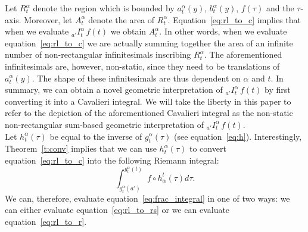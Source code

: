 \documentclass[twoside,reqno,11pt]{fcaa-var} %
\begin{document}
\noindent
Let $R_t^{\alpha}$ denote the region which is bounded by $a_t^{\alpha}(y)$, $b_t^{\alpha}(y)$, $f(\tau)$ and the $\tau$-axis. Moreover, let $A_{t}^{\alpha}$ denote the area of $R_t^{\alpha}$. Equation~\eqref{eq:rl_to_c} implies that when we evaluate $_{a'}I_t^{\alpha}\,f(t)$ we obtain $A_{t}^{\alpha}$. In other words, when we evaluate equation~\eqref{eq:rl_to_c} we are actually summing together the area of an infinite number of non-rectangular infinitesimals inscribing $R_t^{\alpha}$. The aforementioned infinitesimals are, however, non-static, since they need to be translations of $a_t^{\alpha}(y)$. The shape of these infinitesimals are thus dependent on $\alpha$ and $t$. In summary, we can obtain a novel geometric interpretation of 
$_{a'}I_t^{\alpha}\,f(t)$ by first converting it into a Cavalieri integral. We will take the liberty in this paper to refer to the depiction of the aforementioned Cavalieri integral as the non-static non-rectangular sum-based geometric interpretation of $_{a'}I_t^{\alpha}\,f(t)$.\\


\noindent
Let $h_t^{\alpha}(\tau)$ be equal to the inverse of $g_t^{\alpha}(\tau)$ (see equation~\eqref{eq:h}). Interestingly, Theorem~\ref{t:conv} implies that we can use $h_t^{\alpha}(\tau)$ to convert equation~\eqref{eq:rl_to_c} into the following Riemann integral:
\begin{equation}
\label{eq:rl_to_r}
\int_{g_t^{\alpha}(a')}^{g_t^{\alpha}(t)} f\circ h_{\alpha}^t (\tau) d\tau.  
\end{equation}
We can, therefore, evaluate equation~\eqref{eq:frac_integral} in one of two ways: we can either evaluate equation~\eqref{eq:rl_to_rs} or we can evaluate equation~\eqref{eq:rl_to_r}.\\
\end{document}
